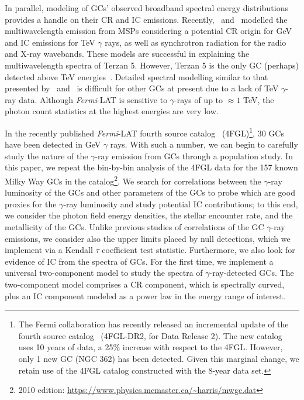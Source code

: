 \documentclass[doublespace,nopageskip]{VTthesis} %
\begin{document}
In parallel, modeling of GCs' observed broadband spectral energy distributions provides a handle on their CR and IC emissions. Recently,~\citet{2013ApJ...779..126K} and~\citet{2019ApJ...880...53N} modelled the multiwavelength emission from MSPs considering a potential CR origin for GeV and IC emissions for TeV $\gamma$ rays, as well as synchrotron radiation for the radio and X-ray wavebands. These models are successful in explaining the multiwavelength spectra of Terzan 5. However, Terzan 5 is the only GC (perhaps) detected above TeV energies~\citep{2011A&A...531L..18H}. Detailed spectral modelling similar to that presented by~\citet{2013ApJ...779..126K} and~\citet{2019ApJ...880...53N} is difficult for other GCs at present due to a lack of TeV $\gamma$-ray data. Although \textit{Fermi}-LAT is sensitive to $\gamma$-rays of up to $\approx 1$ TeV, the photon count statistics at the highest energies are very low.

In the recently published \textit{Fermi}-LAT fourth source catalog~\citep{2020ApJS..247...33A} (4FGL)\footnote{The Fermi collaboration has recently released an incremental update of the fourth source catalog~\citep{2020arXiv200511208B} (4FGL-DR2, for Data Release 2). The new catalog uses 10 years of data, a 25\% increase with respect to the 4FGL. However, only 1 new GC (NGC 362) has been detected. Given this marginal change, we retain use of the 4FGL catalog constructed with the 8-year data set.}, 30 GCs have been detected in GeV $\gamma$ rays. With such a number, we can begin to carefully study the nature of the $\gamma$-ray emission from GCs through a population study. In this paper, we repeat the bin-by-bin analysis of the 4FGL data for the 157 known Milky Way GCs in the \citet{1996AJ....112.1487H} catalog\footnote{2010  edition: \url{https://www.physics.mcmaster.ca/~harris/mwgc.dat}}. We search for correlations between the $\gamma$-ray luminosity of the GCs and other parameters of the GCs to probe which are good proxies for the $\gamma$-ray luminosity and study potential IC contributions; to this end, we consider the photon field energy densities, the stellar encounter rate, and the metallicity of the GCs. Unlike previous studies of correlations of the GC $\gamma$-ray emissions, we consider also the upper limits placed by null detections, which we implement via a Kendall $\tau$ coefficient test statistic. Furthermore, we also look for evidence of IC from the spectra of GCs. For the first time, we implement a universal two-component model to study the spectra of $\gamma$-ray-detected GCs. The two-component model comprises a CR component, which is spectrally curved, plus an IC component modeled as a power law in the energy range of interest.
\end{document}

